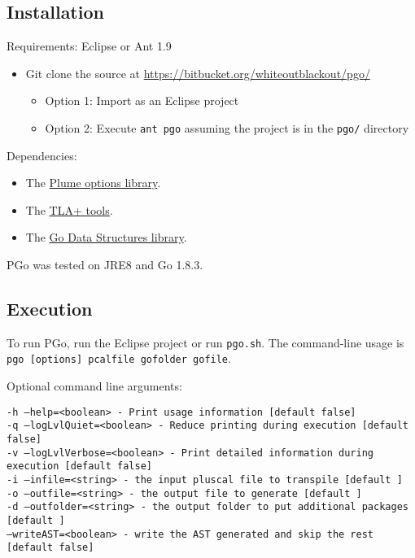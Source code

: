 \subsection{Installation}
Requirements: Eclipse or Ant 1.9

\begin{itemize}
\item Git clone the source at \url{https://bitbucket.org/whiteoutblackout/pgo/}

\begin{itemize}
\item Option 1: Import as an Eclipse project

\item Option 2: Execute \texttt{ant pgo} assuming the project is in the \texttt{pgo/} directory
\end{itemize}
\end{itemize}

Dependencies:
\begin{itemize}
\item The \href{https://mernst.github.io/plume-lib/}
	{Plume options library}.

\item The \href{https://github.com/tlaplus/tlaplus/tree/master/tlatools/src}
	{TLA+ tools}.

\item The \href{https://github.com/emirpasic/gods}
	{Go Data Structures library}.
\end{itemize}


PGo was tested on JRE8 and Go 1.8.3.

\subsection{Execution}
To run PGo, run the Eclipse project or run \texttt{pgo.sh}. The command-line usage is \texttt{pgo [options] pcalfile gofolder gofile}.

Optional command line arguments:

\noindent
\texttt{-h --help=<boolean>          - Print usage information [default false]\\
  -q --logLvlQuiet=<boolean>   - Reduce printing during execution [default false]\\
  -v --logLvlVerbose=<boolean> - Print detailed information during execution  [default false]\\
  -i --infile=<string>         - the input pluscal file to transpile  [default ]\\
  -o --outfile=<string>        - the output file to generate [default ]\\
  -d --outfolder=<string>      - the output folder to put additional packages [default ]\\
  --writeAST=<boolean>         - write the AST generated and skip the rest [default false]}

